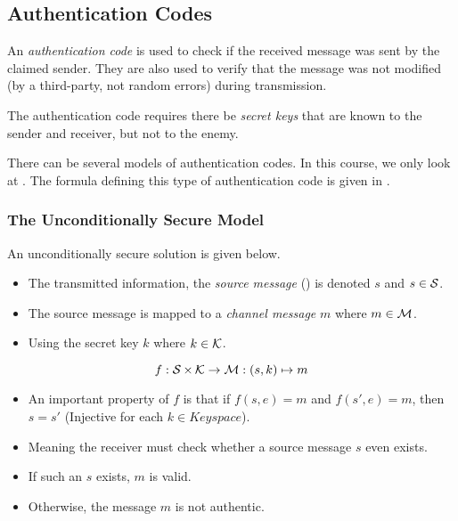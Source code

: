 \subsection{Authentication Codes}\label{subsec:Authentication_Codes}
\begin{definition}\label{def:Authentication_Code}
  An \emph{authentication code} is used to check if the received message was sent by the claimed sender.
  They are also used to verify that the message was not modified (by a third-party, not random errors) during transmission.

  The authentication code requires there be \emph{secret keys} that are known to the sender and receiver, but not to the enemy.

  There can be several models of authentication codes.
  In this course, we only look at .
  The formula defining this type of authentication code is given in .
\end{definition}

\subsubsection{The Unconditionally Secure Model}\label{subsubsec:Authentication_Code_Unconditionally_Secure_Model}
An unconditionally secure solution is given below.
\begin{itemize}[noitemsep]
\item The transmitted information, the \emph{source message} () is denoted $s$ and $s \in \operatorname{\mathcal{S}}$.
\item The source message is mapped to a \emph{channel message} $m$ where $m \in \operatorname{\mathcal{M}}$.
\item Using the secret key $k$ where $k \in \operatorname{\mathcal{K}}$.
\end{itemize}

\begin{equation}\label{eq:Unconditional_Authentication_Code}
  f : \operatorname{\mathcal{S}} \times \operatorname{\mathcal{K}} \rightarrow \mathcal{M} : (s, k) \mapsto m
\end{equation}
\begin{itemize}[noitemsep]
\item An important property of $f$ is that if $f(s, e) = m$ and $f(s', e) = m$, then $s = s'$ (Injective for each $k \in Keyspace$).
\item Meaning the receiver must check whether a source message $s$ even exists.
\item If such an $s$ exists, $m$ is valid.
\item Otherwise, the message $m$ is not authentic.
\end{itemize}

